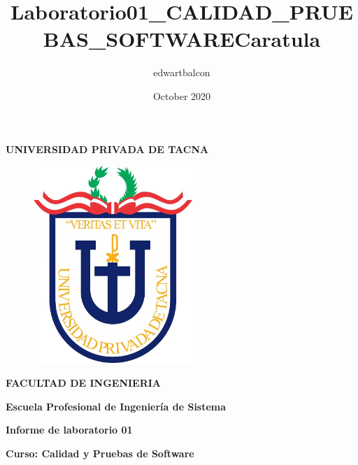 \documentclass{article}
\title{Laboratorio01_CALIDAD_PRUEBAS_SOFTWARE}
\author{edwartbalcon }
\date{October 2020}
\begin{document}
\title{Caratula}

\begin{titlepage}
\begin{center}
\begin{Large}
\textbf{UNIVERSIDAD PRIVADA DE TACNA} \\
\end{Large}
\vspace*{-0.025in}
\begin{figure}[htb]
\begin{center}
\includegraphics[width=6cm]{./images/logo_UPT}
\end{center}
\end{figure}
\vspace*{-0.025in}
\begin{Large}
\textbf{FACULTAD DE INGENIERIA} \\
\end{Large}
\vspace*{0.05in}
\begin{Large}
\textbf{Escuela Profesional de Ingeniería de Sistema} \\
\end{Large}


\vspace*{0.4in}

\vspace*{0.1in}
\begin{Large}
\textbf{Informe de laboratorio 01} \\
\end{Large}

\vspace*{0.3in}
\begin{Large}
\textbf{Curso: Calidad y Pruebas de Software} \\
\end{Large}


\end{center}
\end{titlepage}
\end{document}
